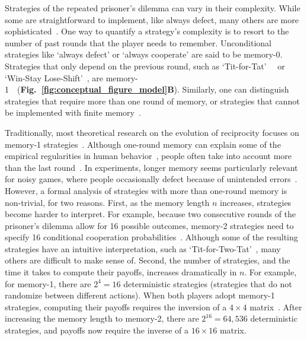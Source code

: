 \documentclass[9pt,twocolumn,twoside]{pnas-new}
\newcommand{\figref}[1]{{\textbf{Fig.~\ref{#1}}}}
\begin{document}
Strategies of the repeated prisoner's dilemma can vary in their complexity.
While some are straightforward to implement, like always defect, many others are more sophisticated~\cite{harper:PLOSONE:2017, knight:PLOSONE:2018}.
One way to quantify a strategy's complexity is to resort to the number of past rounds that the player needs to remember. 
Unconditional strategies like `always defect' or `always cooperate' are said to be \mbox{memory-0}. 
Strategies that only depend on the previous round, such as `Tit-for-Tat'~~\cite{axelrod:AAAS:1981,Duersch:IJGT:2013} or `Win-Stay Lose-Shift'~\cite{Kraines:TaD:1989,nowak:Nature:1993}, are \mbox{memory-1}~~(\figref{fig:conceptual_figure_model}\textbf{B}). 
Similarly, one can distinguish strategies that require more than one round of memory, or strategies that cannot be implemented with finite memory~\cite{Garcia:FRAI:2018}. 

Traditionally, most theoretical research on the evolution of reciprocity focuses on memory-1 strategies~\citep{nowak:Nature:1993,imhof:PNAS:2005,grujic:jtb:2012,van-segbroeck:prl:2012,press:PNAS:2012,stewart:pnas:2013,Toupo:IJBC:2014,stewart:pnas:2014, akin:EGADS:2016,glynatsi:scientific:2020,chen:PNASnexus:2023}.
Although one-round memory can explain some of the empirical regularities in human behavior~\cite{engle:ET:2006, dal:AER:2011, camera:GEB:2012, bruttel:TD:2012,Montero-Porras:SciRep:2022}, people often take into account more than the last round~\cite{romero:EER:2018, kleiman:TEJ:2018}.
In experiments, longer memory seems particularly relevant for noisy games, where people occasionally defect because of unintended errors~\cite{fudenberg:AER:2012}.
However, a formal analysis of strategies with more than one-round memory is non-trivial, for two reasons. 
First, as the memory length $n$ increases, strategies become harder to interpret. 
For example, because two consecutive rounds of the prisoner's dilemma allow for 16 possible outcomes, memory-2 strategies need to specify 16 conditional cooperation probabilities~\citep{hauert:PRSB:1997,Murase:PLoSCompBio:2023a}. 
Although some of the resulting strategies have an intuitive interpretation, such as `Tit-for-Two-Tat'~\citep{axelrod:AAAS:1981}, many others are difficult to make sense of. 
Second, the number of strategies, and the time it takes to compute their payoffs, increases dramatically in $n$. 
For example, for memory-1, there are $2^4\!=\!16$ deterministic strategies (strategies that do not randomize between different actions). 
When both players adopt memory-1 strategies, computing their payoffs requires the inversion of a $4\!\times\!4$ matrix~\cite{sigmund2010}. 
After increasing the memory length to memory-2, there are $2^{16}\!=\!64,536$ deterministic strategies, and payoffs now require the inverse of a $16\!\times\!16$ matrix. 
\end{document}
